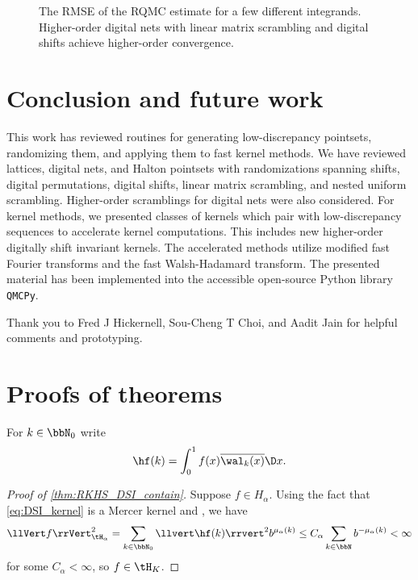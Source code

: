 \documentclass[acmsmall]{acmart}
\begin{document}
\begin{figure}%
    \centering
    \caption{The RMSE of the RQMC estimate for a few different integrands. Higher-order digital nets with linear matrix scrambling and digital shifts achieve higher-order convergence.}
    \Description[]{}
    \label{fig:convergence}
\end{figure}

\section{Conclusion and future work} \label{sec:conclusions_future_work}

This work has reviewed routines for generating low-discrepancy pointsets, randomizing them, and applying them to fast kernel methods. We have reviewed lattices, digital nets, and Halton pointsets with randomizations spanning shifts, digital permutations, digital shifts, linear matrix scrambling, and nested uniform scrambling. Higher-order scramblings for digital nets were also considered. For kernel methods, we presented classes of kernels which pair with low-discrepancy sequences to accelerate kernel computations. This includes new higher-order digitally shift invariant kernels. The accelerated methods utilize modified fast Fourier transforms and the fast Walsh-Hadamard transform. The presented material has been implemented into the accessible open-source Python library \texttt{QMCPy}.  

\begin{acks}
    Thank you to Fred J Hickernell, Sou-Cheng T Choi, and Aadit Jain for helpful comments and prototyping. 
\end{acks}

%




\appendix 

\section{Proofs of theorems} \label{appendix:proofs}

For $k \in \bbN_0$ write
$$\hf(k) = \int_0^1 f(x) \overline{\wal_k(x)} \D x.$$

\begin{proof}[Proof of \cref{thm:RKHS_DSI_contain}] 
    Suppose $f \in H_\alpha$. Using the fact that \eqref{eq:DSI_kernel} is a Mercer kernel and \citep[Theorem 14, Remark 19]{dick.decay_walsh_coefficients_smooth_functions}, we have 
    $$\llVert f \rrVert_{\tH_\alpha}^2 = \sum_{k \in \bbN_0} \llvert \hf(k) \rrvert^2 b^{\mu_\alpha(k)} \leq C_\alpha \sum_{k \in \bbN} b^{-\mu_\alpha(k)} < \infty$$ 
    for some $C_\alpha < \infty$, so $f \in \tH_K$.
\end{proof}
\end{document}

